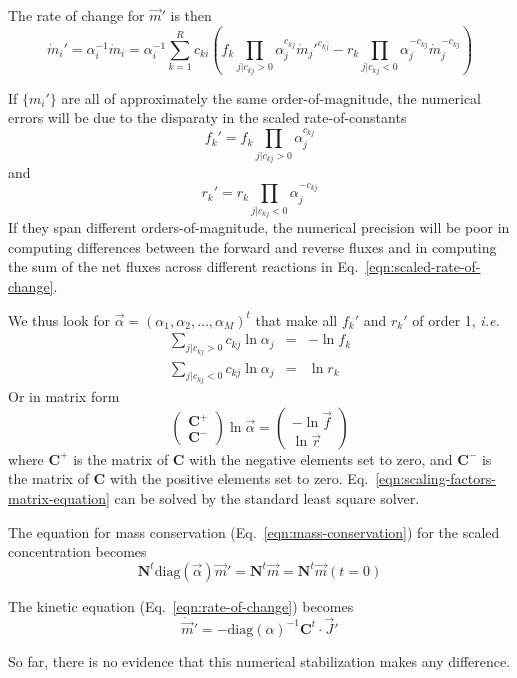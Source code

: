 \documentclass[aps,groupedaddress]{revtex4}
\newcommand*{\mat}[1]{\mathbf{#1}}
\newcommand*{\diag}[1]{\mathrm{diag}({#1})}
\begin{document}
The rate of change for $\vec{m}'$ is then
\begin{equation}
\dot{m}_i' = \alpha_i^{-1} \dot{m}_i = \alpha_i^{-1}\sum_{k=1}^R c_{ki}\left(f_k\prod_{j|c_{kj}>0} \alpha_j^{c_{kj}} \dot{m}_j'^{c_{kj}} - r_k\prod_{j|c_{kj}<0}\alpha_j^{-c_{kj}} \dot{m}_j^{-c_{kj}}\right)
\label{eqn:scaled-rate-of-change}
\end{equation}

If $\{ m_i' \}$ are all of approximately the same order-of-magnitude, the numerical errors will be due to the disparaty in the scaled rate-of-constants
\begin{equation}
f_k' = f_k \prod_{j|c_{kj}>0} \alpha_j^{c_{kj}}
\label{eqn:scaled-forward-rate}
\end{equation}
and
\begin{equation}
r_k' = r_k \prod_{j|c_{kj}<0} \alpha_j^{-c_{kj}}
\label{eqn:scaled-reverse-rate}
\end{equation}
If they span different orders-of-magnitude, the numerical precision
will be poor in computing differences between the forward and reverse
fluxes and in computing the sum of the net fluxes across different
reactions in Eq.~\ref{eqn:scaled-rate-of-change}.  

We thus look for $\vec{\alpha} = (\alpha_1, \alpha_2, \dots,
\alpha_M)^t$ that make all $f_k'$ and $r_k'$ of order 1, {\it i.e.}  
\begin{eqnarray}
\sum_{j|c_{kj}>0} c_{kj}\ln\alpha_j &=& -\ln f_k
\nonumber \\
\sum_{j|c_{kj}<0} c_{kj}\ln\alpha_j &=& \ln r_k
\label{eqn:scaling-factors}
\end{eqnarray}
Or in matrix form
\begin{equation}
\left( \begin{array}{c}
 \mat{C}^+ \\
 \mat{C}^- \end{array} \right) \ln\vec{\alpha}
= \left( \begin{array}{c}
  -\ln \vec{f} \\
  \ln \vec{r} \end{array} \right)
\label{eqn:scaling-factors-matrix-equation}
\end{equation}
where $\mat{C}^+$ is the matrix of $\mat{C}$ with the negative
elements set to zero, and $\mat{C}^-$ is the matrix of $\mat{C}$ with
the positive elements set to zero.
Eq.~\ref{eqn:scaling-factors-matrix-equation} can be solved by
the standard least square solver.

The equation for mass conservation (Eq.~\ref{eqn:mass-conservation})
for the scaled concentration becomes
\begin{equation}
\mat{N}^t \diag{\vec{\alpha}} \vec{m}' = \mat{N}^t \vec{m} = \mat{N}^t\vec{m}(t=0)
\label{eqn:scaled-mass-conservation}
\end{equation}

The kinetic equation (Eq.~\ref{eqn:rate-of-change}) becomes 
\begin{equation}
\dot{\vec{m}}' = -\diag{\alpha}^{-1} \mat{C}^t\cdot \vec{J}'
\label{eqn:scaled-kinetics}
\end{equation}

So far, there is no evidence that this numerical stabilization makes
any difference.
\end{document}
